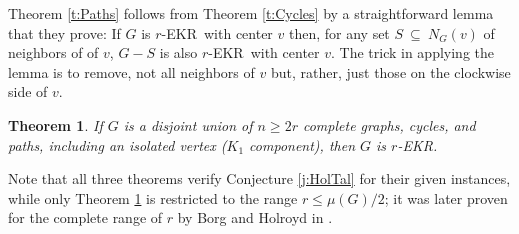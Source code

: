 \documentclass{article}
\newtheorem{thm}{Theorem}%
\def\m{{\mu}}
\def\ekr{{\sf EKR}}
\def\sse{{\subseteq}}
\begin{document}
Theorem \ref{t:Paths} follows from Theorem \ref{t:Cycles} by a straightforward lemma that they prove: If $G$ is $r$-\ekr\ with center $v$ then, for any set $S\ \sse\ N_G(v)$ of neighbors of of $v$, $G-S$ is also $r$-\ekr\ with center $v$.
The trick in applying the lemma is to remove, not all neighbors of $v$ but, rather, just those on the clockwise side of $v$.

\begin{thm}
\label{t:Unions}
If $G$ is a disjoint union of $n\ge 2r$ complete graphs, cycles, and paths, including an isolated vertex ($K_1$ component), then $G$ is $r$-\ekr.
\end{thm}

Note that all three theorems verify Conjecture \ref{j:HolTal} for their given instances, while only Theorem \ref{t:Unions} is restricted to the range $r\le\m(G)/2$; it was later proven for the complete range of $r$ by Borg and Holroyd in \cite{BorgHolrSingle}.
\end{document}
